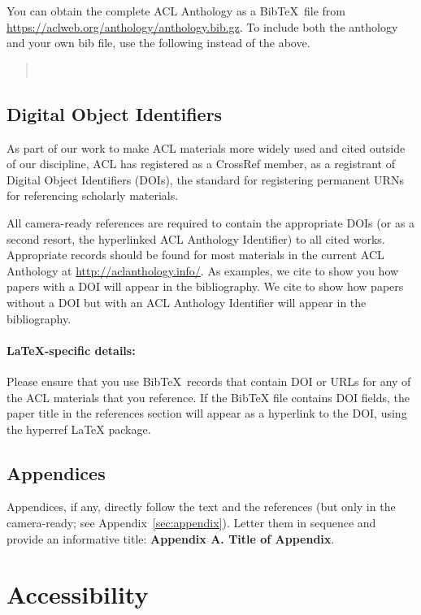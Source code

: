 \documentclass[11pt,a4paper]{article}
\begin{document}
You can obtain the complete ACL Anthology as a Bib\TeX\ file from \url{https://aclweb.org/anthology/anthology.bib.gz}.
To include both the anthology and your own bib file, use the following instead of the above.
\begin{quote}\small
\verb||\\
\verb||
\end{quote}


\subsection{Digital Object Identifiers}
As part of our work to make ACL materials more widely used and cited outside of our discipline, ACL has registered as a CrossRef member, as a registrant of Digital Object Identifiers (DOIs), the standard for registering permanent URNs for referencing scholarly materials.

All camera-ready references are required to contain the appropriate DOIs (or as a second resort, the hyperlinked ACL Anthology Identifier) to all cited works.
Appropriate records should be found for most materials in the current ACL Anthology at \url{http://aclanthology.info/}.
As examples, we cite \citep{goodman-etal-2016-noise} to show you how papers with a DOI will appear in the bibliography.
We cite \citep{harper-2014-learning} to show how papers without a DOI but with an ACL Anthology Identifier will appear in the bibliography.

\paragraph{\LaTeX-specific details:}
Please ensure that you use Bib\TeX\ records that contain DOI or URLs for any of the ACL materials that you reference.
If the Bib\TeX{} file contains DOI fields, the paper title in the references section will appear as a hyperlink to the DOI, using the hyperref \LaTeX{} package.


\subsection{Appendices}
Appendices, if any, directly follow the text and the
references (but only in the camera-ready; see Appendix~\ref{sec:appendix}).
Letter them in sequence and provide an informative title:
\textbf{Appendix A. Title of Appendix}.

\section{Accessibility}
\label{ssec:accessibility}
\end{document}
